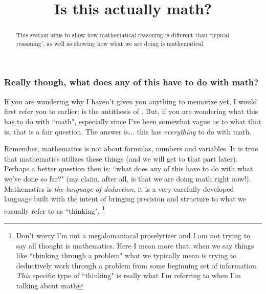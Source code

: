 \documentclass{ximera}
\title{Is this actually math?}
\begin{document}
\begin{abstract}
    This section aims to show how mathematical reasoning is different than `typical reasoning', as well as showing how what we are doing is mathematical.
\end{abstract}
\maketitle

\subsubsection*{Really though, what does any of this have to do with math?}
    \begin{exploration}
        If you are wondering why I haven't given you anything to memorize yet, I would first refer you to earlier;  is the antithesis of . But, if you are wondering what this has to do with ``math", especially since I've been somewhat vague as to what that is, that is a fair question. The answer is... this has \textit{everything} to do with math.
        
        Remember, mathematics is not about formulas, numbers and variables. It is true that mathematics utilizes these things (and we will get to that part later). Perhaps a better question then is; ``what does any of this have to do with what we've done so far?" (my claim, after all, is that we are doing math right now!). Mathematics is \textit{the language of deduction}, it is a very carefully developed language built with the intent of bringing precision and structure to what we casually refer to as ``thinking".%
        \footnote{Don't worry I'm not a megalomaniacal proselytizer and I am not trying to say all thought is mathematics. Here I mean more that; when we say things like ``thinking through a problem" what we typically mean is trying to deductively work through a problem from some beginning set of information. \textit{This} specific type of ``thinking" is really what I'm referring to when I'm talking about math}
    \end{exploration}
    
\end{document}
